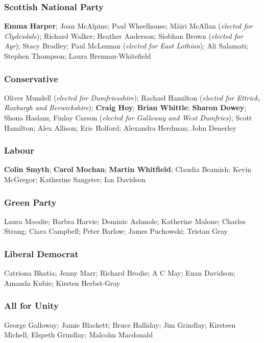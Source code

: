\begin{resultsiii}
	\subsubsection*{Scottish National Party}
	\textbf{Emma Harper}; Joan McAlpine; Paul Wheelhouse; Màiri McAllan (\emph{elected for Clydesdale}); Richard Walker; Heather Anderson; Siobhan Brown (\emph{elected for Ayr}); Stacy Bradley; Paul McLennan (\emph{elected for East Lothian}); Ali Salamati; Stephen Thompson; Laura Brennan-Whitefield
	
	\subsubsection*{Conservative}
	Oliver Mundell (\emph{elected for Dumfriesshire}); Rachael Hamilton (\emph{elected for Ettrick, Roxburgh and Berwickshire}); \textbf{Craig Hoy}; \textbf{Brian Whittle}; \textbf{Sharon Dowey}; Shona Haslam; Finlay Carson (\emph{elected for Galloway and West Dumfries}); Scott Hamilton; Alex Allison; Eric Holford; Alexandra Herdman; John Denerley
	
	\subsubsection*{Labour}
	\textbf{Colin Smyth}; \textbf{Carol Mochan}; \textbf{Martin Whitfield}; Claudia Beamish; Kevin McGregor; Katherine Sangster; Ian Davidson
	
	\subsubsection*{Green Party}
	Laura Moodie; Barbra Harvie; Dominic Ashmole; Katherine Malone; Charles Strang; Ciara Campbell; Peter Barlow; James Puchowski; Tristan Gray
	
	\subsubsection*{Liberal Democrat}
	Catriona Bhatia; Jenny Marr; Richard Brodie; A C May; Euan Davidson; Amanda Kubie; Kirsten Herbst-Gray
	
	\subsubsection*{All for Unity}
	George Galloway; Jamie Blackett; Bruce Halliday; Jim Grindlay; Kirsteen Michell; Elspeth Grindlay; Malcolm Macdonald
	

\end{resultsiii}
